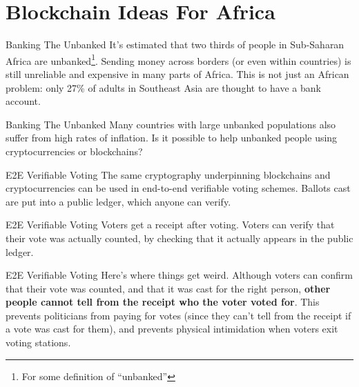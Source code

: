 \documentclass[14pt]{beamer}
\begin{document}
\section{Blockchain Ideas For Africa}

\begin{frame}{Banking The Unbanked}
  It's estimated that two thirds of people in Sub-Saharan Africa are
  unbanked\footnote{For some definition of ``unbanked''}. Sending money across
  borders (or even within countries) is still unreliable and expensive in many
  parts of Africa.
  \newline
  \newline
  This is not just an African problem: only 27\% of adults in Southeast Asia are
  thought to have a bank account.
\end{frame}

\begin{frame}{Banking The Unbanked}
  Many countries with large unbanked populations also suffer from high rates of
  inflation.
  \newline
  \newline
  Is it possible to help unbanked people using cryptocurrencies or
  blockchains?
\end{frame}

\begin{frame}{E2E Verifiable Voting}
  The same cryptography underpinning blockchains and cryptocurrencies can be
  used in end-to-end verifiable voting schemes.
  \newline
  \newline
  Ballots cast are put into a public ledger, which anyone can verify.
\end{frame}

\begin{frame}{E2E Verifiable Voting}
  Voters get a receipt after voting.
  \newline
  \newline
  Voters can verify that their vote was actually counted, by checking that it
  actually appears in the public ledger.
\end{frame}

\begin{frame}{E2E Verifiable Voting}
  Here's where things get weird.
  \newline
  \newline
  Although voters can confirm that their vote was counted, and that it was cast
  for the right person, \textbf{other people cannot tell from the receipt who the
    voter voted for}.
  \newline
  \newline
  This prevents politicians from paying for votes (since they can't tell from
  the receipt if a vote was cast for them), and prevents physical intimidation
  when voters exit voting stations.
\end{frame}
\end{document}
